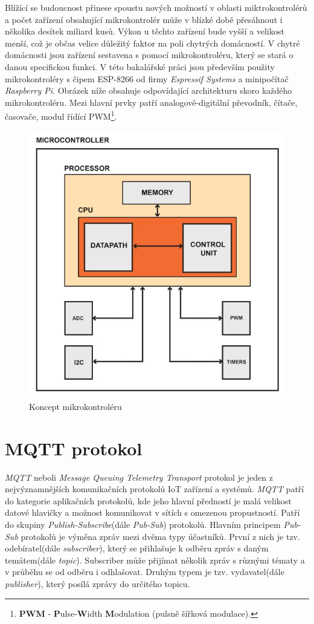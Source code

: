 Blížící se budoucnost přinese spoustu nových možností v oblasti miktrokontrolérů a počet zařízení obsahující mikrokontrolér může v blízké době přesáhnout i několika desítek miliard kusů.
Výkon u těchto zařízení bude vyšší a velikost menší, což je občas velice důležitý faktor na poli chytrých domácností.
V chytré domácnosti jsou zařízení sestavena s pomocí mikrokontroléru, který se stará o danou specifickou funkci. V této bakalářské práci jsou především použity mikrokontroléry s čipem ESP-8266 od firmy \emph{Espressif Systems}
a minipočítač \emph{Raspberry Pi}. Obrázek níže obsahuje odpovídající architekturu skoro každého mikrokontroléru.
Mezi hlavní prvky patří analogově-digitální převodník, čítače, časovače, modul řídící PWM\footnote{\textbf{PWM} - \textbf{P}ulse-\textbf{W}idth \textbf{M}odulation (pulsně šířková modulace).}.

\begin{figure}[hbt]
  \centering
  \includegraphics[width=.6 \linewidth]{obrazky-figures/mcu.jpeg}
  \caption{
    Koncept mikrokontroléru
  }
  \label{figure:mcu}
\end{figure}

\newpage

\section{MQTT protokol}
\label{terminy:mqtt}

\emph{MQTT} neboli \emph{Message Queuing Telemetry Transport} protokol je jeden z nejvýznamnějších komunikačních protokolů IoT zařízení a systémů.
\emph{MQTT} patří do kategorie aplikačních protokolů, kde jeho hlavní předností je malá velikost datové hlavičky a možnost komunikovat v sítích s omezenou propustností.
Patří do skupiny \emph{Publish-Subscribe}(dále \emph{Pub-Sub}) protokolů.
Hlavním principem \emph{Pub-Sub} protokolů je výměna zpráv mezi dvěma typy účastníků. První z nich je tzv. odebíratel(dále \emph{subscriber}),
který se přihlašuje k odběru zpráv s daným temátem(dále \emph{topic}).
Subscriber může přijímat několik zpráv s různými tématy a v průběhu se od odběru i odhlašovat. Druhým typem je tzv. vydavatel(dále \emph{publisher}), který posílá zprávy do určitého
topicu.~\cite{mqtt:info}

